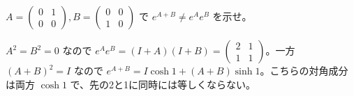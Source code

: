 \documentclass[11pt]{article}
\begin{document}
\problem[可換性の反例]
$A=\begin{pmatrix}0&1\\0&0\end{pmatrix},B=\begin{pmatrix}0&0\\1&0\end{pmatrix}$ で $e^{A+B}\ne e^Ae^B$ を示せ。
\begin{ans}
$A^2=B^2=0$ なので $e^Ae^B=(I+A)(I+B)=\begin{pmatrix}2&1\\1&1\end{pmatrix}$。一方 $(A+B)^2=I$ なので $e^{A+B}=I\cosh1+(A+B)\sinh1$。こちらの対角成分は両方 $\cosh1$ で、先の2と1に同時には等しくならない。
\end{ans}
\end{document}
